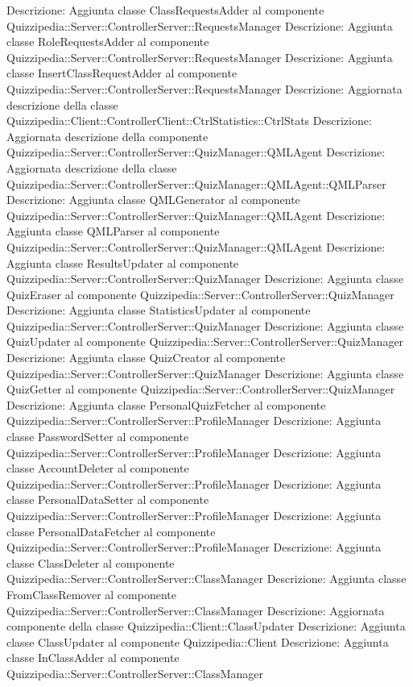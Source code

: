 Descrizione: Aggiunta classe ClassRequestsAdder al componente Quizzipedia::Server::ControllerServer::RequestsManager 
Descrizione: Aggiunta classe RoleRequestsAdder al componente Quizzipedia::Server::ControllerServer::RequestsManager 
Descrizione: Aggiunta classe InsertClassRequestAdder al componente Quizzipedia::Server::ControllerServer::RequestsManager 
Descrizione: Aggiornata descrizione della classe Quizzipedia::Client::ControllerClient::CtrlStatistics::CtrlStats 
Descrizione: Aggiornata descrizione della componente Quizzipedia::Server::ControllerServer::QuizManager::QMLAgent 
Descrizione: Aggiornata descrizione della classe Quizzipedia::Server::ControllerServer::QuizManager::QMLAgent::QMLParser 
Descrizione: Aggiunta classe QMLGenerator al componente Quizzipedia::Server::ControllerServer::QuizManager::QMLAgent 
Descrizione: Aggiunta classe QMLParser al componente Quizzipedia::Server::ControllerServer::QuizManager::QMLAgent 
Descrizione: Aggiunta classe ResultsUpdater al componente Quizzipedia::Server::ControllerServer::QuizManager 
Descrizione: Aggiunta classe QuizEraser al componente Quizzipedia::Server::ControllerServer::QuizManager 
Descrizione: Aggiunta classe StatisticsUpdater al componente Quizzipedia::Server::ControllerServer::QuizManager 
Descrizione: Aggiunta classe QuizUpdater al componente Quizzipedia::Server::ControllerServer::QuizManager 
Descrizione: Aggiunta classe QuizCreator al componente Quizzipedia::Server::ControllerServer::QuizManager 
Descrizione: Aggiunta classe QuizGetter al componente Quizzipedia::Server::ControllerServer::QuizManager 
Descrizione: Aggiunta classe PersonalQuizFetcher al componente Quizzipedia::Server::ControllerServer::ProfileManager 
Descrizione: Aggiunta classe PasswordSetter al componente Quizzipedia::Server::ControllerServer::ProfileManager 
Descrizione: Aggiunta classe AccountDeleter al componente Quizzipedia::Server::ControllerServer::ProfileManager 
Descrizione: Aggiunta classe PersonalDataSetter al componente Quizzipedia::Server::ControllerServer::ProfileManager 
Descrizione: Aggiunta classe PersonalDataFetcher al componente Quizzipedia::Server::ControllerServer::ProfileManager 
Descrizione: Aggiunta classe ClassDeleter al componente Quizzipedia::Server::ControllerServer::ClassManager 
Descrizione: Aggiunta classe FromClassRemover al componente Quizzipedia::Server::ControllerServer::ClassManager 
Descrizione: Aggiornata componente della classe Quizzipedia::Client::ClassUpdater 
Descrizione: Aggiunta classe ClassUpdater al componente Quizzipedia::Client 
Descrizione: Aggiunta classe InClassAdder al componente Quizzipedia::Server::ControllerServer::ClassManager 
